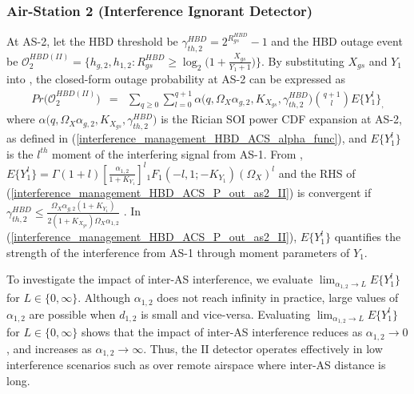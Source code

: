 \subsubsection{Air-Station 2 (Interference Ignorant Detector)} \label{interference_management_HBD_ACS_AS2_II_subsect}
At AS-2, let the HBD threshold be $\gamma_{th,2}^{HBD} = 2^{R_{gs}^{HBD}}-1$ and the HBD outage event be $\mathcal{O}_{2}^{HBD(II)}  = \Big\{ h_{g,2}, h_{1,2} : R_{gs}^{HBD} \geq \log_{2}\Big(1+\frac{X_{gs}}{Y_{1} + 1}\Big)\Big\}$. By substituting $X_{gs}$ and $Y_{1}$ into \cite[Eq. (12)]{rached2017unified}, the closed-form outage probability at AS-2 can be expressed as
\begin{eqnarray} \label{interference_management_HBD_ACS_P_out_as2_II}
 Pr\big(\mathcal{O}_{2}^{HBD(II)}\big) & = & \sum_{q\geq0} \sum_{l=0}^{q+1} \alpha\big(q,\Omega_X \alpha_{g,2}, K_{X_{gs}}, \gamma_{th,2}^{HBD}\big) \binom{q+1}{l} E\{Y_1^l\}_,
\end{eqnarray}
where $\alpha\big(q,\Omega_X \alpha_{g,2}, K_{X_{gs}}, \gamma_{th,2}^{HBD}\big)$ is the Rician SOI power CDF expansion at AS-2, as defined in (\ref{interference_management_HBD_ACS_alpha_func}), and $E\{Y_1^l\}$ is the $l^{th}$ moment of the interfering signal from AS-1. From \cite[Table II]{rached2017unified}, $E\{Y_1^l\} = \Gamma(1+l) \left[\frac{\alpha_{1,2}}{1+K_{Y_1}}\right]^{l} {}_1{F_1}(-l,1;-K_{Y_1}) (\Omega_X)^{l}$ and the RHS of (\ref{interference_management_HBD_ACS_P_out_as2_II}) is convergent if $\gamma_{th,2}^{HBD} \leq \frac{\Omega_{X}\alpha_{g,2}(1+K_{Y_{1}})}{2(1+K_{X_{gs}})\Omega_X\alpha_{1,2}}$ \cite[Eq. (14)]{rached2017unified}. In (\ref{interference_management_HBD_ACS_P_out_as2_II}), $E\{Y_1^l\}$ quantifies the strength of the interference from AS-1 through moment parameters of $Y_1$. 

To investigate the impact of inter-AS interference, we evaluate $\lim_{\alpha_{1,2} \to L} E\{Y_1^l\}$ for $L \in \{0,\infty\}$. Although $\alpha_{1,2}$ does not reach infinity in practice, large values of $\alpha_{1,2}$ are possible when $d_{1,2}$ is small and vice-versa. Evaluating $\lim_{\alpha_{1,2} \to L} E\{Y_1^l\}$ for $L \in \{0,\infty\}$ shows that the impact of inter-AS interference reduces as $\alpha_{1,2} \to 0$, and increases as $\alpha_{1,2} \to \infty$. Thus, the II detector operates effectively in low interference scenarios such as over remote airspace where inter-AS distance is long.

